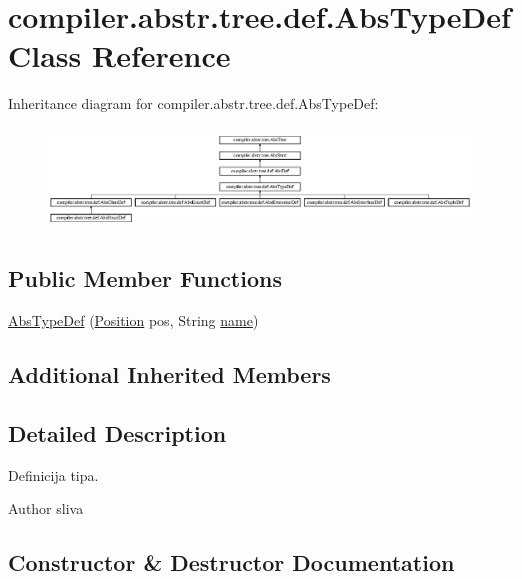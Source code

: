 \hypertarget{classcompiler_1_1abstr_1_1tree_1_1def_1_1_abs_type_def}{}\section{compiler.\+abstr.\+tree.\+def.\+Abs\+Type\+Def Class Reference}
\label{classcompiler_1_1abstr_1_1tree_1_1def_1_1_abs_type_def}
Inheritance diagram for compiler.\+abstr.\+tree.\+def.\+Abs\+Type\+Def\+:\begin{figure}[H]
\begin{center}
\leavevmode
\includegraphics[height=2.709677cm]{classcompiler_1_1abstr_1_1tree_1_1def_1_1_abs_type_def}
\end{center}
\end{figure}
\subsection*{Public Member Functions}
\begin{DoxyCompactItemize}
\item 
\hyperlink{classcompiler_1_1abstr_1_1tree_1_1def_1_1_abs_type_def_a876cefb9eaa4874f75fda0c834c83310}{Abs\+Type\+Def} (\hyperlink{classcompiler_1_1_position}{Position} pos, String \hyperlink{classcompiler_1_1abstr_1_1tree_1_1def_1_1_abs_def_ac6bda9377f5abbb5f1be7d3d1b16481b}{name})
\end{DoxyCompactItemize}
\subsection*{Additional Inherited Members}


\subsection{Detailed Description}
Definicija tipa.

\begin{DoxyAuthor}{Author}
sliva 
\end{DoxyAuthor}


\subsection{Constructor \& Destructor Documentation}
\mbox{\label{classcompiler_1_1abstr_1_1tree_1_1def_1_1_abs_type_def_a876cefb9eaa4874f75fda0c834c83310}} 
